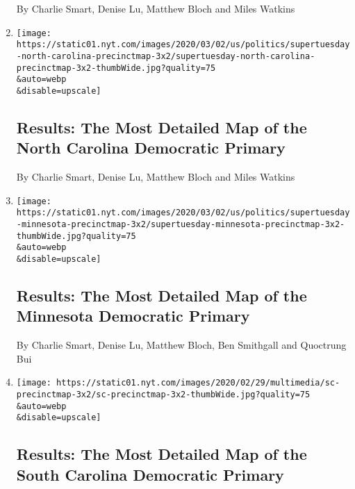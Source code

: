 \begin{enumerate}
  By Charlie Smart, Denise Lu, Matthew Bloch and Miles Watkins
\item
  \href{/interactive/2020/03/03/us/elections/precinct-map-north-carolina-primary.html}{}

  \texttt{[image: https://static01.nyt.com/images/2020/03/02/us/politics/supertuesday-north-carolina-precinctmap-3x2/supertuesday-north-carolina-precinctmap-3x2-thumbWide.jpg?quality=75\\\&auto=webp\\\&disable=upscale]}

  \hypertarget{results-the-most-detailed-map-of-the-north-carolina-democratic-primary}{%
  \subsection{Results: The Most Detailed Map of the North Carolina
  Democratic
  Primary}\label{results-the-most-detailed-map-of-the-north-carolina-democratic-primary}}

  By Charlie Smart, Denise Lu, Matthew Bloch and Miles Watkins
\item
  \href{/interactive/2020/03/03/us/elections/precinct-map-minnesota-primary.html}{}

  \texttt{[image: https://static01.nyt.com/images/2020/03/02/us/politics/supertuesday-minnesota-precinctmap-3x2/supertuesday-minnesota-precinctmap-3x2-thumbWide.jpg?quality=75\\\&auto=webp\\\&disable=upscale]}

  \hypertarget{results-the-most-detailed-map-of-the-minnesota-democratic-primary}{%
  \subsection{Results: The Most Detailed Map of the Minnesota Democratic
  Primary}\label{results-the-most-detailed-map-of-the-minnesota-democratic-primary}}

  By Charlie Smart, Denise Lu, Matthew Bloch, Ben Smithgall and
  Quoctrung Bui
\item
  \href{/interactive/2020/02/29/us/elections/results-south-carolina-primary-precinct-map.html}{}

  \texttt{[image: https://static01.nyt.com/images/2020/02/29/multimedia/sc-precinctmap-3x2/sc-precinctmap-3x2-thumbWide.jpg?quality=75\\\&auto=webp\\\&disable=upscale]}

  \hypertarget{results-the-most-detailed-map-of-the-south-carolina-democratic-primary}{%
  \subsection{Results: The Most Detailed Map of the South Carolina
  Democratic
  Primary}\label{results-the-most-detailed-map-of-the-south-carolina-democratic-primary}}


\end{enumerate}
